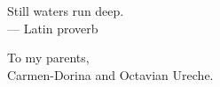 \cleardoublepage
\thispagestyle{empty}


\vspace*{3cm}

\begin{raggedleft}
    	Still waters run deep. \\
     --- Latin proverb\\
\end{raggedleft}

\vspace{4cm}

\begin{center}
    To my parents,\\ Carmen-Dorina and Octavian Ureche.
\end{center}



